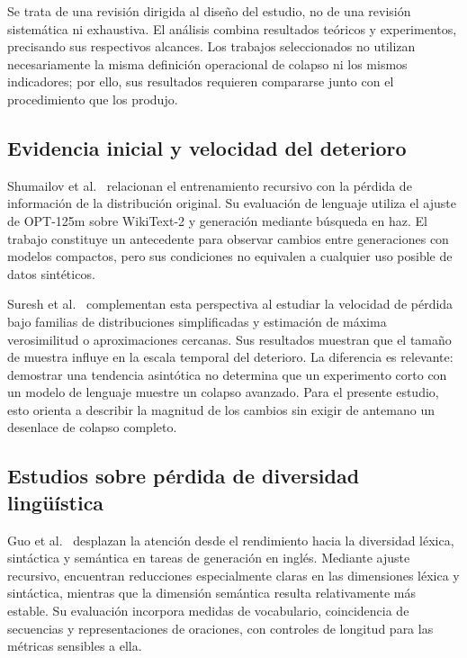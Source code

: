 \documentclass[12pt,letterpaper]{article}
\begin{document}
Se trata de una revisión dirigida al diseño del estudio, no de una revisión
sistemática ni exhaustiva. El análisis combina resultados teóricos y
experimentos, precisando sus respectivos alcances. Los trabajos
seleccionados no utilizan necesariamente la misma definición operacional
de colapso ni los mismos indicadores; por ello, sus resultados requieren
compararse junto con el procedimiento que los produjo.

\subsection{Evidencia inicial y velocidad del deterioro}

Shumailov et al.\ \cite{shumailov2024} relacionan el entrenamiento recursivo
con la pérdida de información de la distribución original. Su evaluación
de lenguaje utiliza el ajuste de OPT-125m sobre WikiText-2 y generación
mediante búsqueda en haz. El trabajo constituye un antecedente para
observar cambios entre generaciones con modelos compactos, pero sus
condiciones no equivalen a cualquier uso posible de datos sintéticos.

Suresh et al.\ \cite{suresh2025} complementan esta perspectiva al estudiar
la velocidad de pérdida bajo familias de distribuciones simplificadas y
estimación de máxima verosimilitud o aproximaciones cercanas. Sus
resultados muestran que el tamaño de muestra influye en la escala temporal
del deterioro. La diferencia es relevante: demostrar una tendencia
asintótica no determina que un experimento corto con un modelo de lenguaje
muestre un colapso avanzado. Para el presente estudio, esto orienta a
describir la magnitud de los cambios sin exigir de antemano un desenlace
de colapso completo.

\subsection{Estudios sobre pérdida de diversidad lingüística}

Guo et al.\ \cite{guo2024} desplazan la atención desde el rendimiento hacia
la diversidad léxica, sintáctica y semántica en tareas de generación en
inglés. Mediante ajuste recursivo, encuentran reducciones especialmente
claras en las dimensiones léxica y sintáctica, mientras que la dimensión
semántica resulta relativamente más estable. Su evaluación incorpora
medidas de vocabulario, coincidencia de secuencias y representaciones
de oraciones, con controles de longitud para las métricas sensibles a ella.
\end{document}
